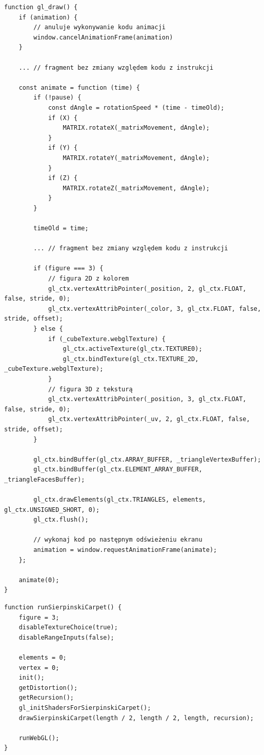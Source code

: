 \documentclass[12pt,a4paper,titlepage]{article}
\newenvironment{longlisting}{}{}
\begin{document}
\begin{longlisting}
\begin{verbatim}
function gl_draw() {
    if (animation) {
        // anuluje wykonywanie kodu animacji
        window.cancelAnimationFrame(animation)
    }

    ... // fragment bez zmiany względem kodu z instrukcji

    const animate = function (time) {
        if (!pause) {
            const dAngle = rotationSpeed * (time - timeOld);
            if (X) {
                MATRIX.rotateX(_matrixMovement, dAngle);
            }
            if (Y) {
                MATRIX.rotateY(_matrixMovement, dAngle);
            }
            if (Z) {
                MATRIX.rotateZ(_matrixMovement, dAngle);
            }
        }

        timeOld = time;

        ... // fragment bez zmiany względem kodu z instrukcji

        if (figure === 3) {
            // figura 2D z kolorem
            gl_ctx.vertexAttribPointer(_position, 2, gl_ctx.FLOAT, false, stride, 0);
            gl_ctx.vertexAttribPointer(_color, 3, gl_ctx.FLOAT, false, stride, offset);
        } else {
            if (_cubeTexture.webglTexture) {
                gl_ctx.activeTexture(gl_ctx.TEXTURE0);
                gl_ctx.bindTexture(gl_ctx.TEXTURE_2D, _cubeTexture.webglTexture);
            }
            // figura 3D z teksturą
            gl_ctx.vertexAttribPointer(_position, 3, gl_ctx.FLOAT, false, stride, 0);
            gl_ctx.vertexAttribPointer(_uv, 2, gl_ctx.FLOAT, false, stride, offset);
        }

        gl_ctx.bindBuffer(gl_ctx.ARRAY_BUFFER, _triangleVertexBuffer);
        gl_ctx.bindBuffer(gl_ctx.ELEMENT_ARRAY_BUFFER, _triangleFacesBuffer);

        gl_ctx.drawElements(gl_ctx.TRIANGLES, elements, gl_ctx.UNSIGNED_SHORT, 0);
        gl_ctx.flush();

        // wykonaj kod po następnym odświeżeniu ekranu
        animation = window.requestAnimationFrame(animate);
    };

    animate(0);
}
\end{verbatim}
\end{longlisting}
\begin{listing}
\caption{Funkcja rysująca}
\end{listing}

\begin{listing}[H]
\caption{Funkcja rysująca dywanu Sierpińskiego}
\begin{verbatim}
function runSierpinskiCarpet() {
    figure = 3;
    disableTextureChoice(true);
    disableRangeInputs(false);

    elements = 0;
    vertex = 0;
    init();
    getDistortion();
    getRecursion();
    gl_initShadersForSierpinskiCarpet();
    drawSierpinskiCarpet(length / 2, length / 2, length, recursion);
    
    runWebGL();
}
\end{verbatim}
\end{listing}
\end{document}
